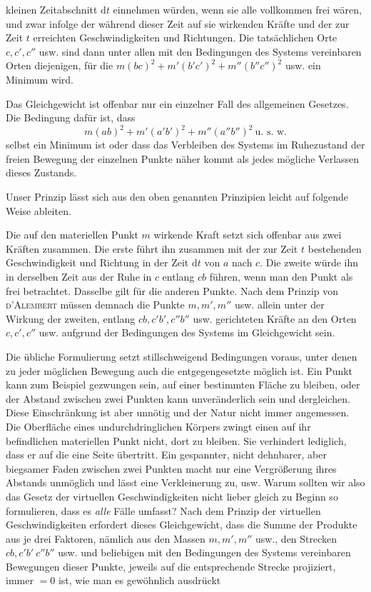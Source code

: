  kleinen Zeitabschnitt $\mathrm{d}t$ einnehmen würden, wenn sie alle vollkommen frei wären, und zwar infolge der während dieser Zeit auf sie wirkenden Kräfte und der zur Zeit $t$ erreichten Geschwindigkeiten und Richtungen. Die tatsächlichen Orte $c,c',c''$ usw. sind dann unter allen mit den Bedingungen des Systems vereinbaren Orten diejenigen, für die $m(bc)^2+m'(b'c')^2+m''(b''c'')^2$ usw. ein Minimum wird.

Das Gleichgewicht ist offenbar nur ein einzelner Fall des allgemeinen Gesetzes. Die Bedingung dafür ist, dass
\[
m(ab)^2+m'(a'b')^2+m''(a''b'')^2\ \text{u. s. w.}
\]
selbst ein Minimum ist oder dass das Verbleiben des Systems im Ruhezustand der freien Bewegung der einzelnen Punkte näher kommt als jedes mögliche Verlassen dieses Zustands.

Unser Prinzip lässt sich aus den oben genannten Prinzipien leicht auf folgende Weise ableiten.

Die auf den materiellen Punkt $m$ wirkende Kraft setzt sich offenbar aus zwei Kräften zusammen. Die erste führt ihn zusammen mit der zur Zeit $t$ bestehenden Geschwindigkeit und Richtung in der Zeit $\mathrm{d}t$ von $a$ nach $c$. Die zweite würde ihn in derselben Zeit aus der Ruhe in $c$ entlang $cb$ führen, wenn man den Punkt als frei betrachtet. Dasselbe gilt für die anderen Punkte. Nach dem Prinzip von \textsc{d’Alembert} müssen demnach die Punkte $m,m',m''$ usw. allein unter der Wirkung der zweiten, entlang $cb,c'b',c''b''$ usw. gerichteten Kräfte an den Orten $c,c',c''$ usw. aufgrund der Bedingungen des Systems im Gleichgewicht sein.

\expandafter\def\csname HistoricalNoteText3\endcsname{Die übliche Formulierung setzt stillschweigend Bedingungen voraus, unter denen zu jeder möglichen Bewegung auch die entgegengesetzte möglich ist. Ein Punkt kann zum Beispiel gezwungen sein, auf einer bestimmten Fläche zu bleiben, oder der Abstand zwischen zwei Punkten kann unveränderlich sein und dergleichen. Diese Einschränkung ist aber unnötig und der Natur nicht immer angemessen. Die Oberfläche eines undurchdringlichen Körpers zwingt einen auf ihr befindlichen materiellen Punkt nicht, dort zu bleiben. Sie verhindert lediglich, dass er auf die eine Seite übertritt. Ein gespannter, nicht dehnbarer, aber biegsamer Faden zwischen zwei Punkten macht nur eine Vergrößerung ihres Abstands unmöglich und lässt eine Verkleinerung zu, usw. Warum sollten wir also das Gesetz der virtuellen Geschwindigkeiten nicht lieber gleich zu Beginn so formulieren, dass es \textit{alle} Fälle umfasst?}
Nach dem Prinzip der virtuellen Geschwindigkeiten erfordert dieses Gleichgewicht, dass die Summe der Produkte aus je drei Faktoren, nämlich aus den Massen $m,m',m''$ usw., den Strecken $cb,c'b'\ c''b''$ usw. und beliebigen mit den Bedingungen des Systems vereinbaren Bewegungen dieser Punkte, jeweils auf die entsprechende Strecke projiziert, immer $=0$ ist, wie man es gewöhnlich ausdrückt
